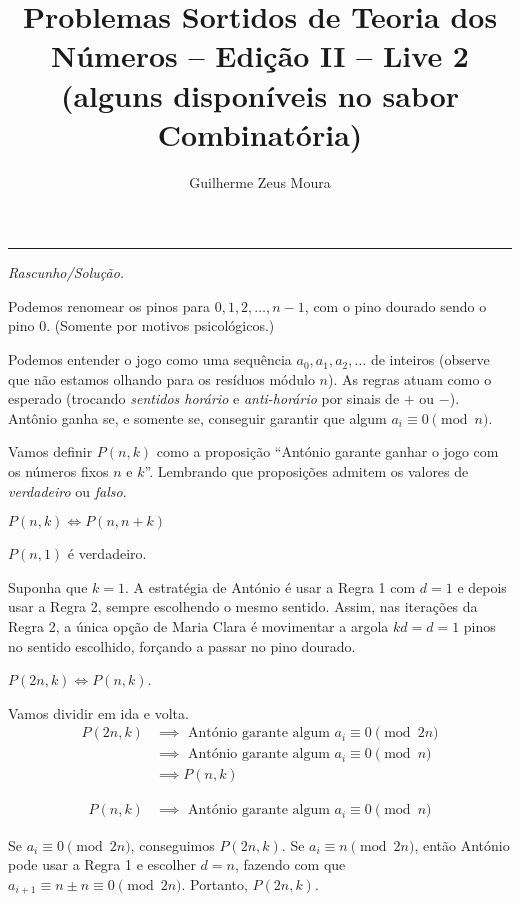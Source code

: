 \documentclass[10pt, a4paper]{article}
\title{Problemas Sortidos de Teoria dos Números -- Edição II -- Live 2 \\\vspace{.25ex}(alguns disponíveis no sabor Combinatória)}
\author{Guilherme Zeus Moura}
\begin{document}
	
	\zeustitle	

	\setcounter{prob}{1}
	\setcounter{thm}{0}

	\begin{center} \rule{.95\textwidth}{.5pt} \end{center}

	\noindent \textit{Rascunho/Solução.}

	Podemos renomear os pinos para $0, 1, 2, \dots, n-1$, com o pino dourado sendo o pino $0$. (Somente por motivos psicológicos.)

	Podemos entender o jogo como uma sequência $a_0, a_1, a_2, \dots$ de inteiros (observe que não estamos olhando para os resíduos módulo $n$). As regras atuam como o esperado (trocando \emph{sentidos horário} e \emph{anti-horário} por sinais de $+$ ou $-$). Antônio ganha se, e somente se, conseguir garantir que algum $a_i \equiv 0 \pmod{n}$.

	Vamos definir $P(n, k)$ como a proposição ``António garante ganhar o jogo com os números fixos $n$ e $k$''. Lembrando que proposições admitem os valores de \emph{verdadeiro} ou \emph{falso}.

	\begin{lem}
		$P(n, k) \iff P(n, n + k)$
	\end{lem}

	\begin{lem}
		$P(n, 1)$ é verdadeiro.
	\end{lem}

	\begin{dem}
		Suponha que $k = 1$. A estratégia de António é usar a Regra 1 com $d = 1$ e depois usar a Regra 2, sempre escolhendo o mesmo sentido. Assim, nas iterações da Regra 2, a única opção de Maria Clara é movimentar a argola $kd = d = 1$ pinos no sentido escolhido, forçando a passar no pino dourado. 
	\end{dem}

	\begin{lem}
		$P(2n, k) \iff P(n, k)$.	
	\end{lem}

	\begin{dem}
		Vamos dividir em ida e volta.
		\begin{align*}
			P(2n, k) & \implies \text{ António garante algum $a_i \equiv 0 \pmod{2n}$}
			\\&\implies \text{ António garante algum $a_i \equiv 0 \pmod{n}$}
			\\&\implies P(n, k)
		\end{align*}

		\begin{align*}
			P(n, k) & \implies \text{ António garante algum $a_i \equiv 0 \pmod{n}$}
		\end{align*}

		Se $a_i \equiv 0 \pmod{2n}$, conseguimos $P(2n, k)$. Se $a_i \equiv n \pmod{2n}$, então António pode usar a Regra 1 e escolher $d = n$, fazendo com que $a_{i+1} \equiv n \pm n \equiv 0 \pmod{2n}$. Portanto, $P(2n, k).$
	\end{dem}
\end{document}
